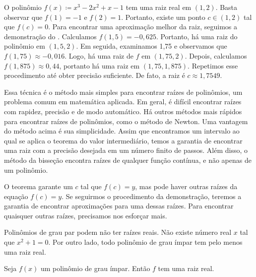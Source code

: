 \begin{example} %
O polinômio $f(x) \coloneqq x^3-2x^2+x-1$ tem uma raiz real em $(1,2)$.
Basta observar que $f(1) = -1$ e $f(2) = 1$. Portanto, existe um ponto
$c \in (1,2)$ tal que $f(c) = 0$. Para encontrar uma aproximação melhor
da raiz, seguimos a demonstração do .
Calculamos $f(1{,}5) = -0{,}625$. Portanto, há uma raiz do polinômio em $(1{,}5,2)$.
Em seguida, examinamos 1,75 e observamos que $f(1{,}75) \approx -0{,}016$.
Logo, há uma raiz de $f$ em $(1{,}75,2)$. Depois, calculamos
$f(1{,}875) \approx 0{,}44$, portanto há uma raiz em $(1{,}75,1{,}875)$.
Repetimos esse procedimento até obter precisão suficiente. De fato,
a raiz é $c \approx 1{,}7549$.
\end{example}

Essa técnica é o método mais simples para encontrar raízes de polinômios,
um problema comum em matemática aplicada. Em geral, é difícil encontrar raízes
com rapidez, precisão e de modo automático.
Há outros métodos mais rápidos para encontrar raízes de polinômios,
como o método de Newton. Uma vantagem do método acima é sua simplicidade.
Assim que encontramos um intervalo ao qual se aplica o teorema do valor
intermediário, temos a garantia de encontrar uma raiz com a precisão desejada
em um número finito de passos. Além disso, o método da bisseção encontra raízes
de qualquer função contínua, e não apenas de um polinômio.

O teorema garante um $c$ tal que $f(c) = y$, mas pode haver outras raízes
da equação $f(c) = y$. Se seguirmos o procedimento da demonstração,
teremos a garantia de encontrar aproximações para uma dessas raízes.
Para encontrar quaisquer outras raízes, precisamos nos esforçar mais.

\medskip

Polinômios de grau par podem não ter raízes reais.
Não existe número real $x$ tal que $x^2+1 = 0$. Por outro lado,
todo polinômio de grau ímpar tem pelo menos uma raiz real.

\begin{prop}
Seja $f(x)$ um polinômio de grau ímpar. Então $f$ tem uma raiz real.
\end{prop}

